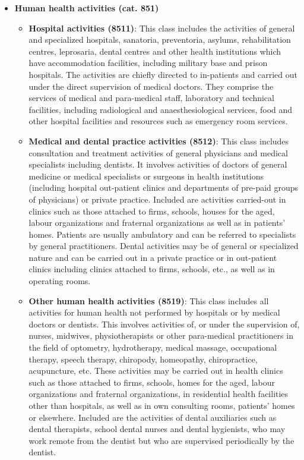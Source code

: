\documentclass[a4paper,12pt]{article}
\begin{document}
\begin{itemize}
\item \textbf{Human health activities (cat. 851)}
\begin{itemize}
\item \textbf{Hospital activities (8511)}: This class includes the activities of general and specialized hospitals, sanatoria, preventoria, asylums, rehabilitation centres, leprosaria, dental centres and other health institutions which have accommodation facilities, including military base and prison hospitals. The activities are chiefly directed to in-patients and carried out under the direct supervision of medical doctors. They comprise the services of medical and para-medical staff, laboratory and technical facilities, including radiological and anaesthesiological services, food and other hospital facilities and resources such as emergency room services.
\item \textbf{Medical and dental practice activities (8512)}: This class includes consultation and treatment activities of general physicians and medical specialists including dentists. It involves activities of doctors of general medicine or medical specialists or surgeons in health institutions (including hospital out-patient clinics and departments of pre-paid groups of physicians) or private practice. Included are activities carried-out in clinics such as those attached to firms, schools, houses for the aged, labour organizations and fraternal organizations as well as in patients' homes. Patients are usually ambulatory and can be referred to specialists by general practitioners. Dental activities may be of general or specialized nature and can be carried out in a private practice or in out-patient clinics including clinics attached to firms, schools, etc., as well as in operating rooms.
\item \textbf{Other human health activities (8519)}: This class includes all activities for human health not performed by hospitals or by medical doctors or dentists. This involves activities of, or under the supervision of, nurses, midwives, physiotherapists or other para-medical practitioners in the field of optometry, hydrotherapy, medical massage, occupational therapy, speech therapy, chiropody, homeopathy, chiropractice, acupuncture, etc. These activities may be carried out in health clinics such as those attached to firms, schools, homes for the aged, labour organizations and fraternal organizations, in residential health facilities other than hospitals, as well as in own consulting rooms, patients' homes or elsewhere. Included are the activities of dental auxiliaries such as dental therapists, school dental nurses and dental hygienists, who may work remote from the dentist but who are supervised periodically by the dentist.

\end{itemize}
\end{itemize}
\end{document}

